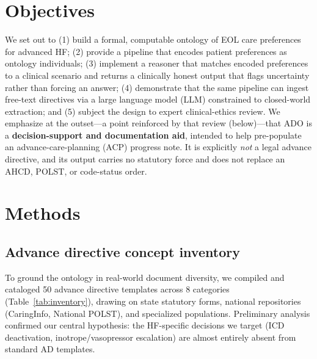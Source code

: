 \documentclass[10pt]{article}
\begin{document}
\section{Objectives}
We set out to (1) build a formal, computable ontology of EOL care preferences for advanced HF; (2) provide a pipeline that encodes patient preferences as ontology individuals; (3) implement a reasoner that matches encoded preferences to a clinical scenario and returns a clinically honest output that flags uncertainty rather than forcing an answer; (4) demonstrate that the same pipeline can ingest free-text directives via a large language model (LLM) constrained to closed-world extraction; and (5) subject the design to expert clinical-ethics review. We emphasize at the outset---a point reinforced by that review (below)---that ADO is a \textbf{decision-support and documentation aid}, intended to help pre-populate an advance-care-planning (ACP) progress note. It is explicitly \emph{not} a legal advance directive, and its output carries no statutory force and does not replace an AHCD, POLST, or code-status order.

\section{Methods}

\subsection{Advance directive concept inventory}
To ground the ontology in real-world document diversity, we compiled and cataloged 50 advance directive templates across 8 categories (Table~\ref{tab:inventory}), drawing on state statutory forms, national repositories (CaringInfo,\cite{caringinfo} National POLST\cite{polst}), and specialized populations. Preliminary analysis confirmed our central hypothesis: the HF-specific decisions we target (ICD deactivation, inotrope/vasopressor escalation) are almost entirely absent from standard AD templates.
\end{document}
